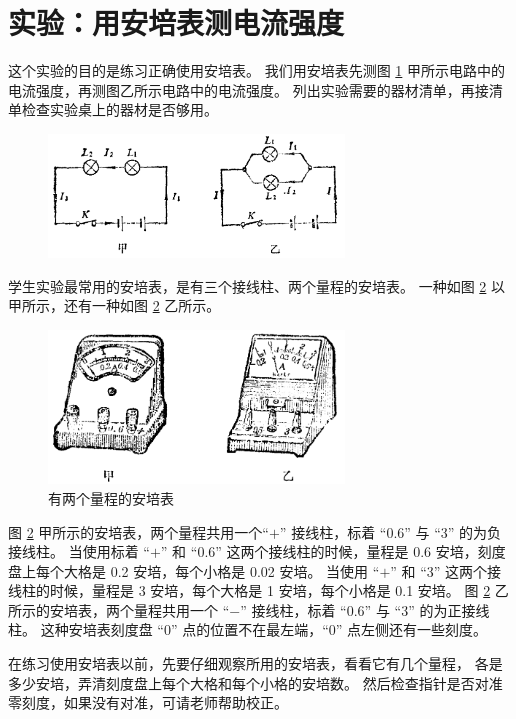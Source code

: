 \section{实验：用安培表测电流强度}\label{sec:8-2}

这个实验的目的是练习正确使用安培表。
我们用安培表先测图 \ref{fig:8-3} 甲所示电路中的电流强度，再测图乙所示电路中的电流强度。
列出实验需要的器材清单，再接清单检查实验桌上的器材是否够用。

\begin{figure}[H]
    \centering
    \includegraphics[width=0.7\textwidth]{../pic/czwl2-ch8-3}
    \caption{}\label{fig:8-3}
\end{figure}

学生实验最常用的安培表，是有三个接线柱、两个量程的安培表。
一种如图 \ref{fig:8-4} 以甲所示，还有一种如图 \ref{fig:8-4} 乙所示。
\begin{figure}[htbp]
    \centering
    \includegraphics[width=0.7\textwidth]{../pic/czwl2-ch8-4}
    \caption{有两个量程的安培表}\label{fig:8-4}
\end{figure}
图 \ref{fig:8-4} 甲所示的安培表，两个量程共用一个“$+$” 接线柱，标着 “0.6” 与 “3” 的为负接线柱。
当使用标着 “$+$” 和 “0.6” 这两个接线柱的时候，量程是 0.6 安培，刻度盘上每个大格是 0.2 安培，每个小格是 0.02 安培。
当使用 “$+$” 和 “3” 这两个接线柱的时候，量程是 3 安培，每个大格是 1 安培，每个小格是 0.1 安培。
图 \ref{fig:8-4} 乙所示的安培表，两个量程共用一个 “$-$” 接线柱，标着 “0.6” 与 “3” 的为正接线柱。
这种安培表刻度盘 “0” 点的位置不在最左端，“0” 点左侧还有一些刻度。

在练习使用安培表以前，先要仔细观察所用的安培表，看看它有几个量程，
各是多少安培，弄清刻度盘上每个大格和每个小格的安培数。
然后检查指针是否对准零刻度，如果没有对准，可请老师帮助校正。

